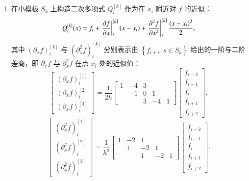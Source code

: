 \begin{enumerate}[wide]
\item 在小模板 $S_{k}$ 上构造二次多项式 $Q_{i}^{[k]}$ 作为在 $x_{i}$ 附近对 $f$ 的近似：
\begin{equation}
Q_{i}^{[k]}(x)=f_{i}+\eval{\pdv{f}{x}}_{i}^{[k]}(x-x_{i})+\eval{\pdv[2]{f}{x}}_{i}^{[k]}\frac{(x-x_{i})^{2}}{2},
\end{equation}
其中 $\left(\partial_{x}f\right)_{i}^{[k]}$ 与 $\left(\partial_{x}^{2}f\right)_{i}^{[k]}$
分别表示由 $\left\{ f_{i+s}:s\in S_{k}\right\} $ 给出的一阶与二阶差商，即 $\partial_{x}f$
与 $\partial_{x}^{2}f$ 在点 $x_{i}$ 处的近似值：
\begin{equation}
\begin{bmatrix}\left(\partial_{x}f\right)_{i}^{[1]}\\
\left(\partial_{x}f\right)_{i}^{[2]}\\
\left(\partial_{x}f\right)_{i}^{[3]}
\end{bmatrix}=\frac{1}{2h}\begin{bmatrix}1 & -4 & 3\\
 & -1 & 0 & 1\\
 &  & 3 & -4 & 1
\end{bmatrix}\begin{bmatrix}f_{i-2}\\
f_{i-1}\\
f_{i}\\
f_{i+1}\\
f_{i+2}
\end{bmatrix},
\end{equation}
\begin{equation}
\begin{bmatrix}\left(\partial_{x}^{2}f\right)_{i}^{[1]}\\
\left(\partial_{x}^{2}f\right)_{i}^{[2]}\\
\left(\partial_{x}^{2}f\right)_{i}^{[3]}
\end{bmatrix}=\frac{1}{h^{2}}\begin{bmatrix}1 & -2 & 1\\
 & 1 & -2 & 1\\
 &  & 1 & -2 & 1
\end{bmatrix}\begin{bmatrix}f_{i-2}\\
f_{i-1}\\
f_{i}\\
f_{i+1}\\
f_{i+2}
\end{bmatrix}.

\end{equation}
\end{enumerate}
